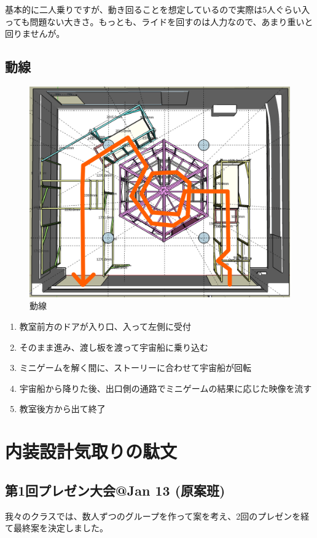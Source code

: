 \documentclass{jsarticle}
\makeatletter
\newenvironment{imageHere}[2][htbp]{\def\@imageHereTmp{#2}%
    \begin{figure}[#1]
        \centering
}{%
        \caption{\@imageHereTmp}
        \label{figs:\@imageHereTmp}
    \end{figure}
}
\makeatother
\begin{document}
基本的に二人乗りですが、動き回ることを想定しているので実際は5人ぐらい入っても問題ない大きさ。もっとも、ライドを回すのは人力なので、あまり重いと回りませんが。

\clearpage

\subsection{動線}

\begin{imageHere}{動線}
    \includegraphics[width=0.6\linewidth]{images/plan_overview/lane.png}
\end{imageHere}

\begin{enumerate}
    \item 教室前方のドアが入り口、入って左側に受付
    \item そのまま進み、渡し板を渡って宇宙船に乗り込む
    \item ミニゲームを解く間に、ストーリーに合わせて宇宙船が回転
    \item 宇宙船から降りた後、出口側の通路でミニゲームの結果に応じた映像を流す
    \item 教室後方から出て終了
\end{enumerate}

\clearpage

\section{内装設計気取りの駄文}

\subsection{第1回プレゼン大会@Jan 13 (原案班)}

我々のクラスでは、数人ずつのグループを作って案を考え、2回のプレゼンを経て最終案を決定しました。
\end{document}
